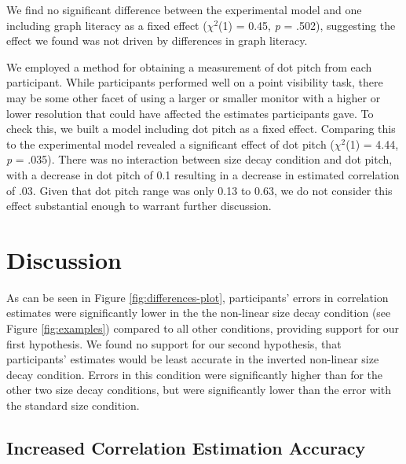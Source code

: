 \documentclass{vgtc}                          %
\begin{document}
We find no significant difference between the experimental model
and one including graph literacy as a fixed effect
(\(\chi^2\)(1) =
0.45, \emph{p}
= .502),
suggesting the effect we found was not driven by differences in graph literacy.

We employed a method for obtaining a measurement of dot pitch from each participant.
While participants performed well on a point visibility task,
there may be some other facet of using a larger or smaller
monitor with a higher or lower resolution that could have affected the estimates
participants gave. To check this, we built a model including dot pitch as a fixed effect.
Comparing this to the experimental model revealed
a significant effect of dot pitch (\(\chi^2\)(1)
= 4.44, \emph{p} = .035).
There was no interaction between size decay condition and dot pitch, with a decrease in dot
pitch of 0.1 resulting in a decrease in estimated correlation of .03. Given
that dot pitch range was only 0.13 to
0.63, we do not consider this effect substantial
enough to warrant further discussion.

\hypertarget{discussion}{%
\section{Discussion}\label{discussion}}

As can be seen in Figure \ref{fig:differences-plot},
participants' errors in correlation estimates were significantly lower in the
the non-linear size decay condition (see Figure \ref{fig:examples})
compared to all other conditions, providing support for our
first hypothesis. We found no support for our second hypothesis, that participants'
estimates would be least accurate in the inverted non-linear size decay condition.
Errors in this condition were significantly higher than for the other two
size decay conditions, but were significantly lower than
the error with the standard size condition.

\hypertarget{increased-correlation-estimation-accuracy}{%
\subsection{Increased Correlation Estimation Accuracy}\label{increased-correlation-estimation-accuracy}}
\end{document}
